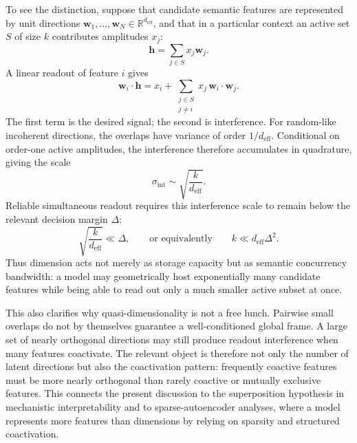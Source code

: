 \documentclass[%
  reprint,
  superscriptaddress,
  showpacs,
  showkeys,
  amsmath,amssymb,
  pra,
  longbibliography,
  floatfix,
  x11names
]{revtex4-2}
\begin{document}
To see the distinction, suppose that candidate semantic features are represented by unit directions $\bm{w}_1,\ldots,\bm{w}_N\in\mathbb{R}^{d_{\mathrm{eff}}}$, and that in a particular context an active set $S$ of size $k$ contributes amplitudes $x_j$:
\begin{equation}
  \bm{h} = \sum_{j\in S} x_j \bm{w}_j .
\end{equation}
A linear readout of feature $i$ gives
\begin{equation}
  \bm{w}_i\cdot\bm{h}
  = x_i + \sum_{\substack{j\in S\\ j\neq i}} x_j\,\bm{w}_i\cdot\bm{w}_j .
\end{equation}
The first term is the desired signal; the second is interference. For random-like incoherent directions, the overlaps have variance of order $1/d_{\mathrm{eff}}$. Conditional on order-one active amplitudes, the interference therefore accumulates in quadrature, giving the scale
\begin{equation}
  \sigma_{\mathrm{int}} \sim \sqrt{\frac{k}{d_{\mathrm{eff}}}} .
\end{equation}
Reliable simultaneous readout requires this interference scale to remain below the relevant decision margin $\Delta$:
\begin{equation}
  \sqrt{\frac{k}{d_{\mathrm{eff}}}} \ll \Delta,
  \qquad\text{or equivalently}\qquad
  k \ll d_{\mathrm{eff}}\Delta^2 .
\end{equation}
Thus dimension acts not merely as storage capacity but as semantic concurrency bandwidth: a model may geometrically host exponentially many candidate features while being able to read out only a much smaller active subset at once.

This also clarifies why quasi-dimensionality is not a free lunch. Pairwise small overlaps do not by themselves guarantee a well-conditioned global frame. A large set of nearly orthogonal directions may still produce readout interference when many features coactivate. The relevant object is therefore not only the number of latent directions but also the coactivation pattern: frequently coactive features must be more nearly orthogonal than rarely coactive or mutually exclusive features. This connects the present discussion to the superposition hypothesis in mechanistic interpretability and to sparse-autoencoder analyses, where a model represents more features than dimensions by relying on sparsity and structured coactivation.
\end{document}
